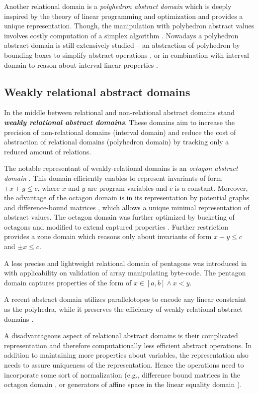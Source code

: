 Another relational domain is a \emph{polyhedron abstract domain} which is
deeply inspired by the theory of linear programming and optimization
\cite{Cousot1978} and provides a unique representation. Though, the
manipulation with polyhedron abstract values involves costly computation of a
simplex algorithm \cite{Schrijver1986}. Nowadays a polyhedron abstract domain
is still extensively studied -- an abstraction of polyhedron by bounding boxes
to simplify abstract operations \cite{Singh2017}, or in combination with interval
domain to reason about interval linear properties \cite{Chen2009}.

\subsection{Weakly relational abstract domains}

In the middle between relational and non-relational abstract domains stand
\textbf{\emph{weakly relational abstract domains}}. These domains aim to
increase the precision of non-relational domains (interval domain) and reduce
the cost of abstraction of relational domains (polyhedron domain) by tracking
only a reduced amount of relations.

The notable representant of weakly-relational domains is an \emph{octagon
abstract domain} \cite{Mine2006}. This domain efficiently enables to represent
invariants of form $\pm x \pm y \leq c$, where $x$ and $y$ are program
variables and $c$ is a constant.  Moreover, the advantage of the octagon domain
is in its representation by potential graphs and difference-bound matrices
\cite{Larsen1997}, which allows a unique minimal representation of abstract
values. The octagon domain was further optimized by bucketing of octagons
\cite{Blanchet2003, Venet2004} and modified to extend captured properties
\cite{Claris2004, Mine2004}. Further restriction provides a zone domain
\cite{Mine2001} which reasons only about invariants of form $x - y \leq c$ and
$\pm x \leq c$.

A less precise and lightweight relational domain of pentagons was introduced in
\cite{Logozzo2010} with applicability on validation of array manipulating
byte-code. The pentagon domain captures properties of the form of $x \in [a,b]
\wedge x < y$.

A recent abstract domain utilizes parallelotopes to encode any linear
constraint as the polyhedra, while it preserves the efficiency of weakly
relational abstract domains \cite{Amato2017}.

A disadvantageous aspect of relational abstract domains is their complicated
representation and therefore computationally less efficient abstract
operations. In addition to maintaining more properties about variables, the
representation also needs to assure uniqueness of the representation. Hence the
operations need to incorporate some sort of normalization (e.g., difference
bound matrices in the octagon domain \cite{Mine2006}, or generators of affine
space in the linear equality domain \cite{Karr1976}).

